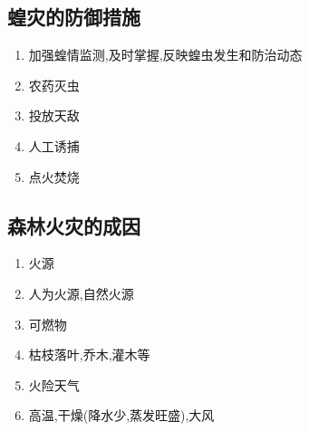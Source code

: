 \documentclass[a4paper]{article}
\begin{document}
    \subsection{蝗灾的防御措施}
    \begin{enumerate}
        \item 加强蝗情监测,及时掌握,反映蝗虫发生和防治动态
        \item 农药灭虫
        \item 投放天敌
        \item 人工诱捕
        \item 点火焚烧
    \end{enumerate}
    \subsection{森林火灾的成因}
    \begin{enumerate}
        \item 火源
            \item 人为火源,自然火源
        \item 可燃物
            \item 枯枝落叶,乔木,灌木等
        \item 火险天气
            \item 高温,干燥(降水少,蒸发旺盛),大风
    \end{enumerate}
\end{document}
